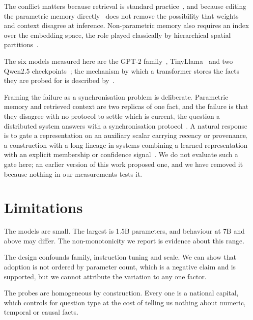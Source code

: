 \documentclass{article}
\begin{document}
The conflict matters because retrieval is standard
practice~\citep{lewis2020rag, guu2020realm, gao2023ragsurvey}, and because
editing the parametric memory directly~\citep{meng2022rome, meng2023memit} does
not remove the possibility that weights and context disagree at inference.
Non-parametric memory also requires an index over the embedding space, the role
played classically by hierarchical spatial
partitions~\citep{thakur2022quadtree}.

The six models measured here are the GPT-2 family~\citep{radford2019gpt2},
TinyLlama~\citep{zhang2024tinyllama} and two Qwen2.5
checkpoints~\citep{yang2024qwen2}; the mechanism by which a transformer
stores the facts they are probed for is described
by~\citet{geva2021kv}.

Framing the failure as a synchronisation problem is deliberate. Parametric memory
and retrieved context are two replicas of one fact, and the failure is that they
disagree with no protocol to settle which is current, the question a distributed
system answers with a synchronisation protocol~\citep{thakur2022clock}. A natural
response is to gate a representation on an auxiliary scalar carrying recency or
provenance, a construction with a long lineage in systems combining a learned
representation with an explicit membership or confidence
signal~\citep{thakur2021neurofuzzy}. We do not evaluate such a gate here; an
earlier version of this work proposed one, and we have removed it because nothing
in our measurements tests it.

\section{Limitations}

The models are small. The largest is 1.5B parameters, and behaviour at 7B and
above may differ. The non-monotonicity we report is evidence about this range.

The design confounds family, instruction tuning and scale. We can show that
adoption is not ordered by parameter count, which is a negative claim and is
supported, but we cannot attribute the variation to any one factor.

The probes are homogeneous by construction. Every one is a national capital,
which controls for question type at the cost of telling us nothing about numeric,
temporal or causal facts.
\end{document}
